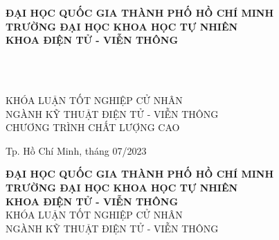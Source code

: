 \hypersetup{pageanchor=false}
\begin{titlepage}

\begin{center}
\textbf{ĐẠI HỌC QUỐC GIA THÀNH PHỐ HỒ CHÍ MINH\\
TRƯỜNG ĐẠI HỌC KHOA HỌC TỰ NHIÊN\\
KHOA ĐIỆN TỬ - VIỄN THÔNG}\\[2cm]


{ \Large \bfseries \tenSV \\[2cm] } 


{ \Large \bfseries \tenKL \\[3cm]} 


\large KHÓA LUẬN TỐT NGHIỆP CỬ NHÂN\\
\large NGÀNH KỸ THUẬT ĐIỆN TỬ - VIỄN THÔNG\\
\large CHƯƠNG TRÌNH CHẤT LƯỢNG CAO\\



\vfill
Tp. Hồ Chí Minh, tháng 07/2023

\end{center}

\pagebreak

\myemptypage

\begin{center}
\textbf{ĐẠI HỌC QUỐC GIA THÀNH PHỐ HỒ CHÍ MINH\\
TRƯỜNG ĐẠI HỌC KHOA HỌC TỰ NHIÊN\\
KHOA ĐIỆN TỬ - VIỄN THÔNG}\\[2cm]

\large KHÓA LUẬN TỐT NGHIỆP CỬ NHÂN\\
\large NGÀNH KỸ THUẬT ĐIỆN TỬ - VIỄN THÔNG\\[2cm]


\end{center}
\end{titlepage}
